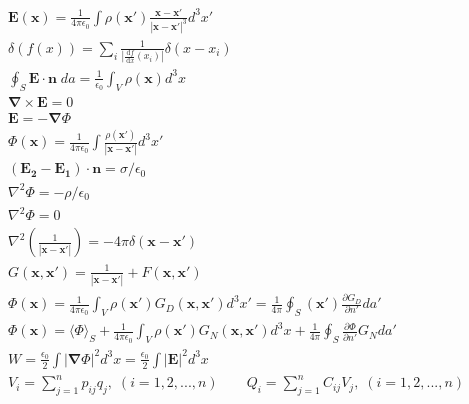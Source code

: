 \documentclass[10pt]{article}
\newcommand{\vect}[1]{\mathbf{#1}}
\newcommand{\vc}[1]{\mathbf{#1}}
\newcommand{\dd}{\, \mathrm{d}}
\newcommand{\eo}{\epsilon_0}
\newcommand{\tder}[2]{\frac{\dd #1}{\dd #2}}
\newcommand{\pder}[2]{\frac{\partial #1}{\partial #2}}
\newcommand{\K}{\frac{1}{4 \pi \eo}}
\begin{document}
\setlength{\abovedisplayskip}{0pt}
\setlength{\belowdisplayskip}{0pt}
\setlength{\abovedisplayshortskip}{0pt}
\setlength{\belowdisplayshortskip}{0pt}
\begin{align*}
& \vect{E}(\vect{x}) = \frac{1}{4 \pi \eo} \int \rho(\vect{x}') \frac{\vect{x} - \vect{x}'}{|\vect{x} - \vect{x}'|^3} d^3x' \tag*{Coulomb's Law (1.5)} \\
& \delta(f(x)) = \sum_{i} \frac{1}{\left|\tder{f}{x}(x_i)\right|}\delta(x - x_i)	\tag*{Delta function Rule 5 } \\
& \oint_S \vc{E} \cdot \vc{n} \; da = \frac{1}{\eo} \int_V \rho(\vc{x}) d^3x	\tag*{Gauss' Law (1.11)} \\
& \vc{\nabla} \times \vc{E} = 0	\tag*{Curl of electric field (1.14)} \\
& \vc{E} = -\vc{\nabla} \Phi	\tag*{Electric field in terms of scalar potential (1.16)} \\
& \Phi(\vc{x}) = \K \int \frac{\rho (\vc{x}')}{|\vc{x} - \vc{x}'|} d^3 x' \tag*{Scalar potential in terms of charge density (1.17)} \\
& (\vc{E_2} - \vc{E_1}) \cdot \vc{n} = \sigma/\eo	\tag*{Electric field of a surface distribution (1.22)} \\
& \nabla^2 \Phi = -\rho/\eo	\tag*{Poisson Equation (1.28)}\\
& \nabla^2 \Phi = 0		\tag*{Laplace Equation (1.29)}\\
& \nabla^2 \left( \frac{1}{|\vc{x} - \vc{x}'|} \right) = - 4 \pi \delta(\vc{x} - \vc{x}') \tag*{Laplace's equation for a point charge (1.31)} \\
& G(\vc{x}, \vc{x}') = \frac{1}{|\vc{x} - \vc{x}'|} + F(\vc{x}, \vc{x}')	\tag*{Green's function for Poisson's equation (1.40)} \\
& \Phi(\vc{x}) = \K \int_V \rho(\vc{x}') G_D(\vc{x}, \vc{x}') d^3x' = \frac{1}{4 \pi} \oint_S(\vc{x}') \pder{G_D}{n'} da'	\tag*{Green's function potential Dirichlet B.C.s (1.44)} \\
& \Phi(\vc{x}) = \langle\Phi\rangle_S + \K \int_V \rho(\vc{x}') G_N(\vc{x},\vc{x}') d^3x + \frac{1}{4 \pi} \oint_S \pder{\Phi}{n'} G_N da'	\tag*{Green's function potential Neumann B.C.s (1.46)} \\
& W = \frac{\eo}{2} \int |\vc{\nabla} \Phi|^2 d^3x = \frac{\eo}{2} \int \left| \vc{E} \right|^2 d^3 x	\tag*{Energy stored in electric field (1.54)} \\
& V_i = \sum_{j=1}^{n} p_{ij} q_j, \; (i = 1,2,...,n)	
\qquad Q_i = \sum_{j=1}^{n} C_{ij} V_j, \; (i=1,2,...,n) \tag*{Capactiance matrix (1.62)} \\

\end{align*}
\end{document}

